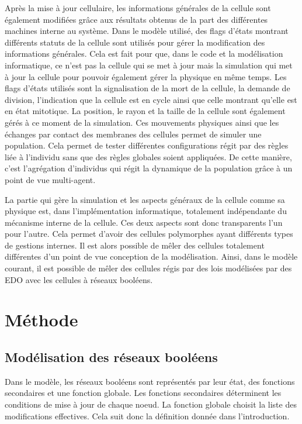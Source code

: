 \documentclass[11pt, a4paper]{article}
\begin{document}
Après la mise à jour cellulaire, les informations générales de la cellule sont
également modifiées grâce aux résultats obtenus de la part des différentes
machines interne au système.  Dans le modèle utilisé, des flags d'états
montrant différents statuts de la cellule sont utilisés pour gérer la
modification des informations générales. Cela est fait pour que, dans le code
et la modélisation informatique, ce n'est pas la cellule qui se met à jour mais
la simulation qui met à jour la cellule pour pouvoir également gérer la
physique en même temps.  Les flags d'états utilisés sont la signalisation de la
mort de la cellule, la demande de division, l'indication que la cellule est en
cycle ainsi que celle montrant qu'elle est en état mitotique. La position, le
rayon et la taille de la cellule sont également gérés à ce moment de la
simulation.  Ces mouvements physiques ainsi que les échanges par contact des
membranes des cellules permet de simuler une population. Cela permet de tester
différentes configurations régit par des règles liée à l'individu sans que des
règles globales soient appliquées.  De cette manière, c'est l'agrégation
d'individus qui régit la dynamique de la population grâce à un point de vue
multi-agent.

La partie qui gère la simulation et les aspects généraux de la cellule comme sa
physique est, dans l'implémentation informatique, totalement indépendante du
mécanisme interne de la cellule.  Ces deux aspects sont donc transparents l'un
pour l'autre. Cela permet d'avoir des cellules polymorphes ayant différents
types de gestions internes. Il est alors possible de mêler des cellules
totalement différentes d'un point de vue conception de la modélisation.  Ainsi,
dans le modèle courant, il est possible de mêler des cellules régis par des
lois modélisées par des EDO avec les cellules à réseaux booléens.

\newpage
\section{Méthode}
\subsection{Modélisation des réseaux booléens}
Dans le modèle, les réseaux booléens sont représentés par leur état, des
fonctions secondaires et une fonction globale. Les fonctions secondaires
déterminent les conditions de mise à jour de chaque noeud. La fonction globale
choisit la liste des modifications effectives.  Cela suit donc la définition
donnée dans l'introduction.
\end{document}
